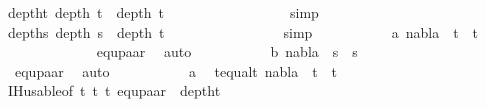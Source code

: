 \begin{isabellebody}
\ deptht{}{\isacharcolon}{\kern0pt}\ {\isachardoublequoteopen}depth\ t{}{\isacharprime}{\kern0pt}\ {\isacharless}{\kern0pt}\ depth\ t{}{\isachardoublequoteclose}\ \isanewline
\ \ \ \ \ \ \ \ \ \ \ \ \isamarkupfalse%
\ {}{\isacharparenleft}{\kern0pt}{}{\isacharparenright}{\kern0pt}\ \isamarkupfalse%
\ simp\isanewline
\ \ \ \ \ \ \ \ \ \isamarkupfalse%
\ depths{}{\isacharcolon}{\kern0pt}\ {\isachardoublequoteopen}depth\ s{}{\isacharprime}{\kern0pt}\ {\isacharless}{\kern0pt}\ depth\ t{}{\isachardoublequoteclose}\ \isanewline
\ \ \ \ \ \ \ \ \ \ \ \isamarkupfalse%
\ {}{\isacharparenleft}{\kern0pt}{}{\isacharparenright}{\kern0pt}\ \isamarkupfalse%
\ simp\isanewline
\ \ \ \ \ \ \ \ \ \isamarkupfalse%
\ a{\isacharcolon}{\kern0pt}\ {\isachardoublequoteopen}nabla\ {\isasymturnstile}\ t{}{\isacharprime}{\kern0pt}\ {\isasymapprox}\ t{}{\isacharprime}{\kern0pt}{\isachardoublequoteclose}\ \isanewline
\ \ \ \ \ \ \ \ \ \ \ \isamarkupfalse%
\ {\isachardoublequoteopen}{}{\isachardoublequoteclose}{\isacharparenleft}{\kern0pt}{}{\isacharcomma}{\kern0pt}{}{\isacharparenright}{\kern0pt}\ equ{\isacharunderscore}{\kern0pt}paar\ \isamarkupfalse%
\ auto\isanewline
\ \ \ \ \ \ \ \ \ \isamarkupfalse%
\ b{\isacharcolon}{\kern0pt}\ {\isachardoublequoteopen}nabla\ {\isasymturnstile}\ s{}{\isacharprime}{\kern0pt}\ {\isasymapprox}\ s{}{\isacharprime}{\kern0pt}{\isachardoublequoteclose}\ \isanewline
\ \ \ \ \ \ \ \ \ \ \ \isamarkupfalse%
\ {\isachardoublequoteopen}{}{\isachardoublequoteclose}\ equ{\isacharunderscore}{\kern0pt}paar\ \isamarkupfalse%
\ auto\isanewline
\ \ \ \ \ \ \ \ \ \isamarkupfalse%
\ a\ \isamarkupfalse%
\ t{}{\isacharunderscore}{\kern0pt}equal{\isacharunderscore}{\kern0pt}t{}{\isacharcolon}{\kern0pt}\ {\isachardoublequoteopen}nabla\ {\isasymturnstile}\ t{}{\isacharprime}{\kern0pt}\ {\isasymapprox}\ t{}{\isacharprime}{\kern0pt}{\isachardoublequoteclose}\ \isanewline
\ \ \ \ \ \ \ \ \ \ \ \isamarkupfalse%
\ IH{\isacharunderscore}{\kern0pt}usable{\isacharbrackleft}{\kern0pt}of\ t{}{\isacharprime}{\kern0pt}\ t{}{\isacharprime}{\kern0pt}\ t{}{\isacharprime}{\kern0pt}{\isacharbrackright}{\kern0pt}\ equ{\isacharunderscore}{\kern0pt}paar{\isacharparenleft}{\kern0pt}{}{\isacharparenright}{\kern0pt}\ {}{\isacharparenleft}{\kern0pt}{}{\isacharparenright}{\kern0pt}\ deptht{}\isanewline

\end{isabellebody}
